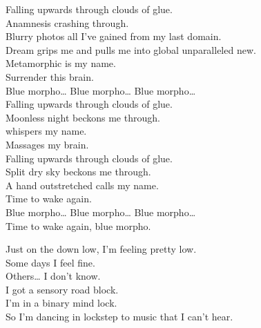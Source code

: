 


Falling upwards through clouds of glue. \\
Anamnesis crashing through. \\
Blurry photos all I've gained from my last domain. \\

Dream grips me and pulls me into global unparalleled new. \\
Metamorphic is my name. \\
Surrender this brain. \\

Blue morpho… Blue morpho… Blue morpho… \\

Falling upwards through clouds of glue. \\
Moonless night beckons me through. \\
 whispers my name. \\
Massages my brain. \\

Falling upwards through clouds of glue. \\
Split dry sky beckons me through. \\
A hand outstretched calls my name. \\
Time to wake again. \\

Blue morpho… Blue morpho… Blue morpho… \\

Time to wake again, blue morpho. \\




Just on the down low, I'm feeling pretty low. \\
Some days I feel fine. \\
Others… I don't know. \\
I got a sensory road block. \\
I'm in a binary mind lock. \\
So I'm dancing in lockstep to music that I can't hear. \\

